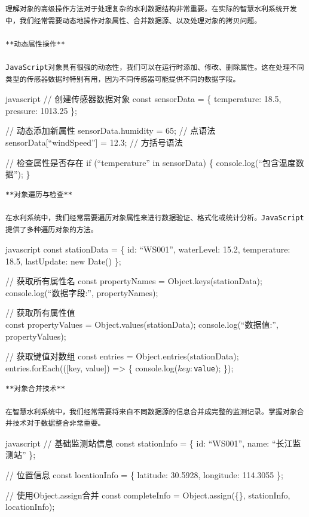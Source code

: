 {\begin{lstlisting}
理解对象的高级操作方法对于处理复杂的水利数据结构非常重要。在实际的智慧水利系统开发中，我们经常需要动态地操作对象属性、合并数据源、以及处理对象的拷贝问题。

**动态属性操作**

JavaScript对象具有很强的动态性，我们可以在运行时添加、修改、删除属性。这在处理不同类型的传感器数据时特别有用，因为不同传感器可能提供不同的数据字段。
\end{lstlisting}

javascript // 创建传感器数据对象 const sensorData = \{ temperature: 18.5, pressure: 1013.25 \};

// 动态添加新属性 sensorData.humidity = 65; // 点语法 sensorData{[}``windSpeed''{]} = 12.3; // 方括号语法

// 检查属性是否存在 if (``temperature'' in sensorData) \{ console.log(``包含温度数据''); \}

\begin{lstlisting}
**对象遍历与检查**

在水利系统中，我们经常需要遍历对象属性来进行数据验证、格式化或统计分析。JavaScript提供了多种遍历对象的方法。
\end{lstlisting}

javascript const stationData = \{ id: ``WS001'', waterLevel: 15.2, temperature: 18.5, lastUpdate: new Date() \};

// 获取所有属性名 const propertyNames = Object.keys(stationData); console.log(``数据字段:'', propertyNames);

// 获取所有属性值\\
const propertyValues = Object.values(stationData); console.log(``数据值:'', propertyValues);

// 获取键值对数组 const entries = Object.entries(stationData); entries.forEach(({[}key, value{]}) =\textgreater{} \{ console.log(\texttt{${key}: ${value}}); \});

\begin{lstlisting}
**对象合并技术**

在智慧水利系统中，我们经常需要将来自不同数据源的信息合并成完整的监测记录。掌握对象合并技术对于数据整合非常重要。
\end{lstlisting}

javascript // 基础监测站信息 const stationInfo = \{ id: ``WS001'', name: ``长江监测站'' \};

// 位置信息 const locationInfo = \{ latitude: 30.5928, longitude: 114.3055 \};

// 使用Object.assign合并 const completeInfo = Object.assign(\{\}, stationInfo, locationInfo);

}
